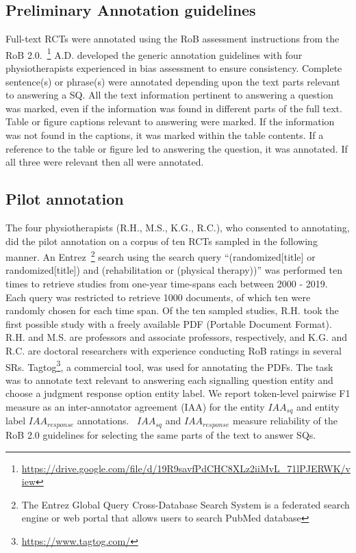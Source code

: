 \documentclass{IOS-Book-Article}
\begin{document}
\subsection{Preliminary Annotation guidelines}
\label{subsec:annot_guide}
%
Full-text RCTs were annotated using the RoB assessment instructions from the RoB 2.0.~\footnote{\url{https://drive.google.com/file/d/19R9savfPdCHC8XLz2iiMvL_71lPJERWK/view}}
A.D. developed the generic annotation guidelines with four physiotherapists experienced in bias assessment to ensure consistency.
Complete sentence(s) or phrase(s) were annotated depending upon the text parts relevant to answering a SQ.
All the text information pertinent to answering a question was marked, even if the information was found in different parts of the full text.
Table or figure captions relevant to answering were marked.
If the information was not found in the captions, it was marked within the table contents.
If a reference to the table or figure led to answering the question, it was annotated.
If all three were relevant then all were annotated.
%
\subsection{Pilot annotation}
\label{subsec:annotation}
%
The four physiotherapists (R.H., M.S., K.G., R.C.), who consented to annotating, did the pilot annotation on a corpus of ten RCTs sampled in the following manner.
An Entrez~\footnote{The Entrez Global Query Cross-Database Search System is a federated search engine or web portal that allows users to search PubMed database} search using the search query ``{\selectfont (randomized[title] or randomized[title]) and (rehabilitation or (physical therapy))}'' was performed ten times to retrieve studies from one-year time-spans each between 2000 - 2019.
Each query was restricted to retrieve 1000 documents, of which ten were randomly chosen for each time span.
Of the ten sampled studies, R.H. took the first possible study with a freely available PDF (Portable Document Format).
R.H. and M.S. are professors and associate professors, respectively, and K.G. and R.C. are doctoral researchers with experience conducting RoB ratings in several SRs.
Tagtog\footnote{\url{https://www.tagtog.com/}}, a commercial tool, was used for annotating the PDFs.
The task was to annotate text relevant to answering each signalling question entity and choose a judgment response option entity label.
We report token-level pairwise F1 measure as an inter-annotator agreement (IAA) for the entity $IAA_{sq}$ and entity label $IAA_{response}$ annotations.~\cite{deleger2012building}
$IAA_{sq}$ and $IAA_{response}$ measure reliability of the RoB 2.0 guidelines for selecting the same parts of the text to answer SQs.
%
%
%
\end{document}
